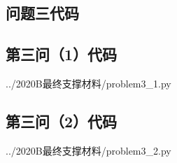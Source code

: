 \documentclass{cumcmthesis}
\numberwithin{equation}{section}
\numberwithin{figure}{section}
\numberwithin{table}{section}
\begin{document}
\begin{appendices}
\section{问题三代码}
\subsection{第三问（1）代码}

    {../2020B最终支撑材料/problem3_1.py}

\subsection{第三问（2）代码}

    {../2020B最终支撑材料/problem3_2.py}





\end{appendices}
\end{document}
